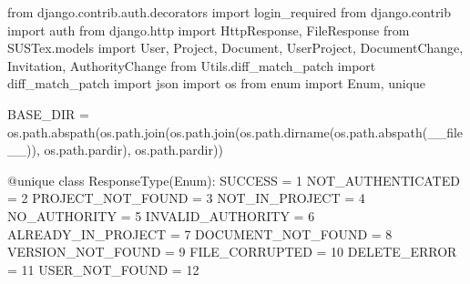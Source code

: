 from django.contrib.auth.decorators import login_required
from django.contrib import auth
from django.http import HttpResponse, FileResponse
from SUSTex.models import User, Project, Document, UserProject, DocumentChange, Invitation, AuthorityChange
from Utils.diff_match_patch import diff_match_patch
import json
import os
from enum import Enum, unique

BASE_DIR = os.path.abspath(os.path.join(os.path.join(os.path.dirname(os.path.abspath(__file__)), os.path.pardir), os.path.pardir))

@unique
class ResponseType(Enum):
    SUCCESS = 1
    NOT_AUTHENTICATED = 2
    PROJECT_NOT_FOUND = 3
    NOT_IN_PROJECT = 4
    NO_AUTHORITY = 5
    INVALID_AUTHORITY = 6
    ALREADY_IN_PROJECT = 7
    DOCUMENT_NOT_FOUND = 8
    VERSION_NOT_FOUND = 9
    FILE_CORRUPTED = 10
    DELETE_ERROR = 11
    USER_NOT_FOUND = 12


